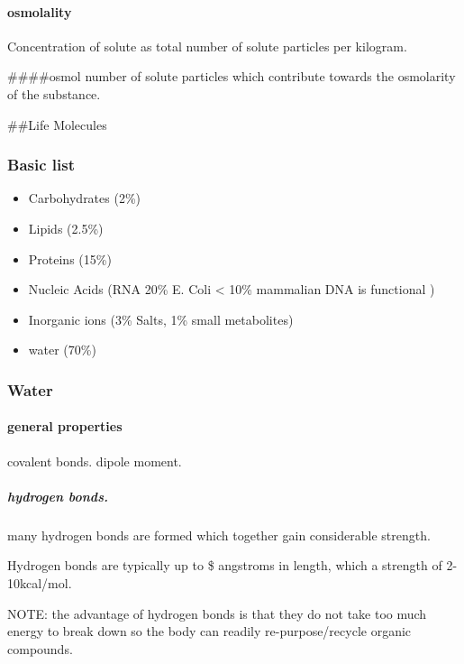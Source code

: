 \documentclass[]{article}
\providecommand{\tightlist}{%
  \setlength{\itemsep}{0pt}\setlength{\parskip}{0pt}}
\let\oldparagraph\paragraph
\renewcommand{\paragraph}[1]{\oldparagraph{#1}\mbox{}}
\let\oldsubparagraph\subparagraph
\renewcommand{\subparagraph}[1]{\oldsubparagraph{#1}\mbox{}}
\begin{document}
\hypertarget{osmolality}{%
\paragraph{osmolality}\label{osmolality}}

Concentration of solute as total number of solute particles per
kilogram.

\#\#\#\#osmol number of solute particles which contribute towards the
osmolarity of the substance.

\#\#Life Molecules

\hypertarget{basic-list}{%
\subsubsection{Basic list}\label{basic-list}}

\begin{itemize}
\tightlist
\item
  Carbohydrates (2\%)
\item
  Lipids (2.5\%)
\item
  Proteins (15\%)
\item
  Nucleic Acids (RNA 20\% E. Coli \textless{} 10\% mammalian DNA is
  functional )
\item
  Inorganic ions (3\% Salts, 1\% small metabolites)
\item
  water (70\%)
\end{itemize}

\hypertarget{water}{%
\subsubsection{Water}\label{water}}

\hypertarget{general-properties}{%
\paragraph{general properties}\label{general-properties}}

covalent bonds. dipole moment.

\hypertarget{hydrogen-bonds.}{%
\subparagraph{hydrogen bonds.}\label{hydrogen-bonds.}}

many hydrogen bonds are formed which together gain considerable
strength.

Hydrogen bonds are typically up to \$ angstroms in length, which a
strength of 2-10kcal/mol.

NOTE: the advantage of hydrogen bonds is that they do not take too much
energy to break down so the body can readily re-purpose/recycle organic
compounds.
\end{document}
